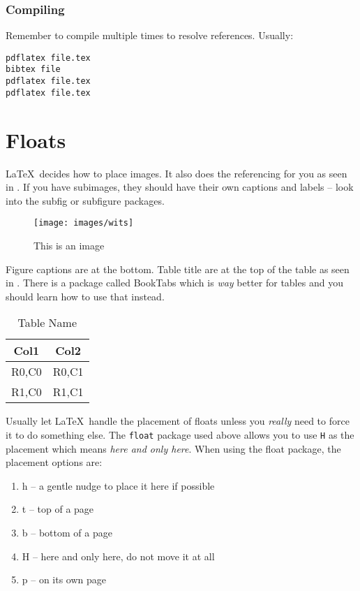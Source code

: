 \documentclass[a4paper,twoside,12pt]{report}
\begin{document}
\subsection{Compiling}
Remember to compile multiple times to resolve references. Usually:
\begin{verbatim}
pdflatex file.tex
bibtex file
pdflatex file.tex
pdflatex file.tex
\end{verbatim}


\chapter{Floats}
\LaTeX\ decides how to place images. It also does the referencing for you as seen in . If you have subimages, they should have their own captions and labels -- look into the subfig or subfigure packages.

\begin{figure}[ht]
	\centering
	\texttt{[image: images/wits]}
	\caption{This is an image}
	\label{fig:thing1}
\end{figure}

Figure captions are at the bottom. Table title are at the top of the table as seen in . There is a package called BookTabs which is \textit{way} better for tables and you should learn how to use that instead.

\begin{table}[p]
	\centering
	\caption{Table Name}
	\label{tab:tab1}
\begin{tabular}{cc}
	\hline
	Col1 & Col2\\
	\hline\hline 
	R0,C0 & R0,C1 \\ 
	R1,C0 & R1,C1 \\ 
	\hline
\end{tabular} 
\end{table}

Usually let \LaTeX\ handle the placement of floats unless you \textit{really} need to force it to do something else. The \texttt{float} package used above allows you to use \texttt{H} as the placement which means \textit{here and only here}. When using the float package, the placement options are:
\begin{enumerate}
\item h -- a gentle nudge to place it here if possible
\item t -- top of a page
\item b -- bottom of a page
\item H -- here and only here, do not move it at all
\item p -- on its own page
\end{enumerate}
\end{document}
